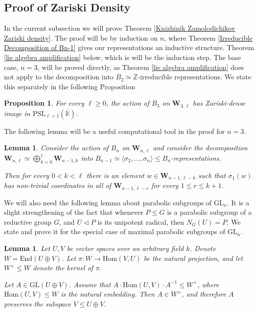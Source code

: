 \documentclass[letterpaper]{amsart}
\newtheorem{lemma}[theorem]{Lemma}
\newtheorem{proposition}[theorem]{Proposition}
\begin{document}
\subsection{Proof of Zariski Density}
In the current subsection we will prove Theorem \ref{Knizhinik Zamolodichikov Zariski density}. The proof will be by induction on $n$, where Theorem \ref{Irreducible Decomposition of Bn-1} gives our representations an inductive structure. Theorem \ref{lie algebra amplification} below, which is \cite[Theorem 7.4]{kuperberg2018tqft} will be the induction step. The base case, $n = 3$, will be proved directly, as Theorem \ref{lie algebra amplification} does not apply to the decomposition into $B_2 \simeq \mathbb{Z}$-irreducible representations. We state this separately in the following Proposition
\begin{proposition}
\label{Zariski density n=3}
    For every $\ell \geq 0$, the action of $B_3$ on $\textbf{W}_{3,\ell}$ has Zariski-dense image in $\mathrm{PSL}_{\ell + 1}(\bar{\mathbb{K}})$.
\end{proposition}
The following lemma \cite[Lemma 19]{jackson2011lawrence} will be a useful computational tool in the proof for $n = 3$.
\begin{lemma}
\label{Mixing subspaces Jackson}
Consider the action of $B_{n}$ on $\textbf{W}_{n, \ell}$ and consider the decomposition $\textbf{W}_{n, \ell} \simeq \bigoplus_{k = 0}^\ell \textbf{W}_{n - 1, k}$ into $B_{n-1} \simeq \langle \sigma_2, \dots, \sigma_n \rangle \leq B_n$-representations.

Then for every $0 < k < \ell$ there is an element $w \in \textbf{W}_{n - 1,\ell - k}$ such that $\sigma_1(w)$ has non-trivial coordinates in all of $\textbf{W}_{n - 1, \ell - r}$ for every $1 \leq r \leq k + 1$.
\end{lemma}
We will also need the following lemma about parabolic subgroups of $\mathrm{GL}_n$. It is a slight strengthening of the fact that whenever $P \leq G$ is a parabolic subgroup of a reductive group $G$, and $U \lhd P$ is its unipotent radical, then $N_G(U) =P$. We state and prove it for the special case of maximal parabolic subgroups of $\mathrm{GL}_n.$
\begin{lemma}
\label{Parabolic subgroup reducibility}
Let $U, V$ be vector spaces over an arbitrary field $k$. Denote $W = \mathrm{End}(U \oplus V)$. Let $\pi: W \to \mathrm{Hom}(V, U)$ be the natural projection, and let $W^+ \leq W$ denote the kernel of $\pi$.
    
Let $A \in \mathrm{GL}(U \oplus V)$. Assume that $A \cdot \mathrm{Hom}(U, V) \cdot A^{-1} \leq W^+$, where $\mathrm{Hom}(U, V) \leq W$ is the natural embedding. Then $A \in W^+$, and therefore $A$ preserves the subspace $V \leq U \oplus V$.
\end{lemma}
\end{document}
